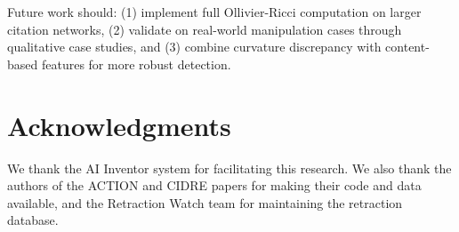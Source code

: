 \documentclass[11pt,letterpaper]{article}
\begin{document}
Future work should: (1) implement full Ollivier-Ricci computation on larger citation networks, (2) validate on real-world manipulation cases through qualitative case studies, and (3) combine curvature discrepancy with content-based features for more robust detection.

\section*{Acknowledgments}

We thank the AI Inventor system for facilitating this research. We also thank the authors of the ACTION and CIDRE papers for making their code and data available, and the Retraction Watch team for maintaining the retraction database.



\end{document}
